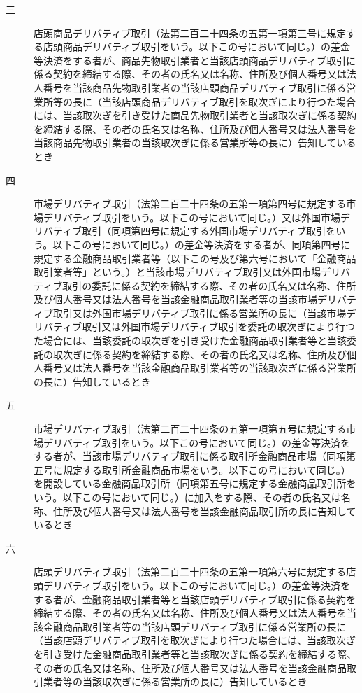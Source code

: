\documentclass[twocolumn,a4j,10pt]{ltjtarticle}
\begin{document}
\begin{description}
\begin{description}
\item[三]店頭商品デリバティブ取引（法第二百二十四条の五第一項第三号に規定する店頭商品デリバティブ取引をいう。以下この号において同じ。）の差金等決済をする者が、商品先物取引業者と当該店頭商品デリバティブ取引に係る契約を締結する際、その者の氏名又は名称、住所及び個人番号又は法人番号を当該商品先物取引業者の当該店頭商品デリバティブ取引に係る営業所等の長に（当該店頭商品デリバティブ取引を取次ぎにより行つた場合には、当該取次ぎを引き受けた商品先物取引業者と当該取次ぎに係る契約を締結する際、その者の氏名又は名称、住所及び個人番号又は法人番号を当該商品先物取引業者の当該取次ぎに係る営業所等の長に）告知しているとき
\item[四]市場デリバティブ取引（法第二百二十四条の五第一項第四号に規定する市場デリバティブ取引をいう。以下この号において同じ。）又は外国市場デリバティブ取引（同項第四号に規定する外国市場デリバティブ取引をいう。以下この号において同じ。）の差金等決済をする者が、同項第四号に規定する金融商品取引業者等（以下この号及び第六号において「金融商品取引業者等」という。）と当該市場デリバティブ取引又は外国市場デリバティブ取引の委託に係る契約を締結する際、その者の氏名又は名称、住所及び個人番号又は法人番号を当該金融商品取引業者等の当該市場デリバティブ取引又は外国市場デリバティブ取引に係る営業所の長に（当該市場デリバティブ取引又は外国市場デリバティブ取引を委託の取次ぎにより行つた場合には、当該委託の取次ぎを引き受けた金融商品取引業者等と当該委託の取次ぎに係る契約を締結する際、その者の氏名又は名称、住所及び個人番号又は法人番号を当該金融商品取引業者等の当該取次ぎに係る営業所の長に）告知しているとき
\item[五]市場デリバティブ取引（法第二百二十四条の五第一項第五号に規定する市場デリバティブ取引をいう。以下この号において同じ。）の差金等決済をする者が、当該市場デリバティブ取引に係る取引所金融商品市場（同項第五号に規定する取引所金融商品市場をいう。以下この号において同じ。）を開設している金融商品取引所（同項第五号に規定する金融商品取引所をいう。以下この号において同じ。）に加入をする際、その者の氏名又は名称、住所及び個人番号又は法人番号を当該金融商品取引所の長に告知しているとき
\item[六]店頭デリバティブ取引（法第二百二十四条の五第一項第六号に規定する店頭デリバティブ取引をいう。以下この号において同じ。）の差金等決済をする者が、金融商品取引業者等と当該店頭デリバティブ取引に係る契約を締結する際、その者の氏名又は名称、住所及び個人番号又は法人番号を当該金融商品取引業者等の当該店頭デリバティブ取引に係る営業所の長に（当該店頭デリバティブ取引を取次ぎにより行つた場合には、当該取次ぎを引き受けた金融商品取引業者等と当該取次ぎに係る契約を締結する際、その者の氏名又は名称、住所及び個人番号又は法人番号を当該金融商品取引業者等の当該取次ぎに係る営業所の長に）告知しているとき

\end{description}
\end{description}
\end{document}
